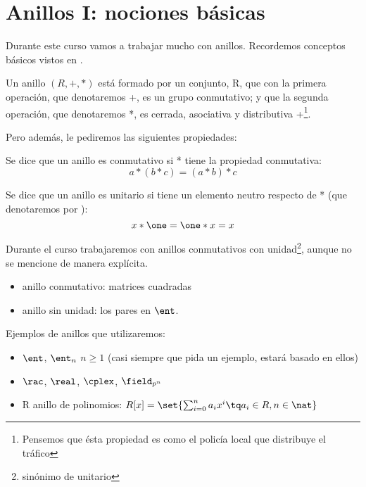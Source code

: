 \chapter{Anillos I: nociones básicas}

Durante este curso vamos a trabajar mucho con anillos. Recordemos conceptos básicos vistos en \cite{apuntesEA}.

\begin{defn}[Anillo]
Un anillo $(R, +, * )$ está formado por un conjunto, R, que con la primera operación, que denotaremos +, es un grupo conmutativo; y que la segunda operación, que denotaremos *, es cerrada, asociativa y distributiva \wrt +\footnote{Pensemos que ésta propiedad es como el policía local que distribuye el tráfico}.
\end{defn}

Pero además, le pediremos las siguientes propiedades:

\begin{defn}
Se dice que un anillo es conmutativo si * tiene la propiedad conmutativa:
\[ a*(b*c) = (a*b)*c \]
\end{defn}

\begin{defn}
Se dice que un anillo es unitario si tiene un elemento neutro respecto de * (que denotaremos por \one):
\[ x*\one = \one*x = x \]
\end{defn}

\obs Durante el curso trabajaremos con anillos conmutativos con unidad\footnote{sinónimo de unitario}, aunque no se mencione de manera explícita.

\begin{example}
\begin{itemize}
	\item anillo conmutativo: matrices cuadradas
	\item anillo sin unidad: los pares en $\ent$.
\end{itemize}
\end{example}

Ejemplos de anillos que utilizaremos:

\begin{example}
\begin{itemize}
	\item $\ent$, $\ent_n$ $n \geq 1$ (casi siempre que pida un ejemplo, estará basado en ellos)
	\item $\rac$, $\real$, $\cplex$, $\field_{p^n}$
	\item R anillo de polinomios: $R[x] = \set{ \sum_{i=0}^n a_i x^i \tq a_i \in R, n \in \nat}$
\end{itemize}
\end{example}

